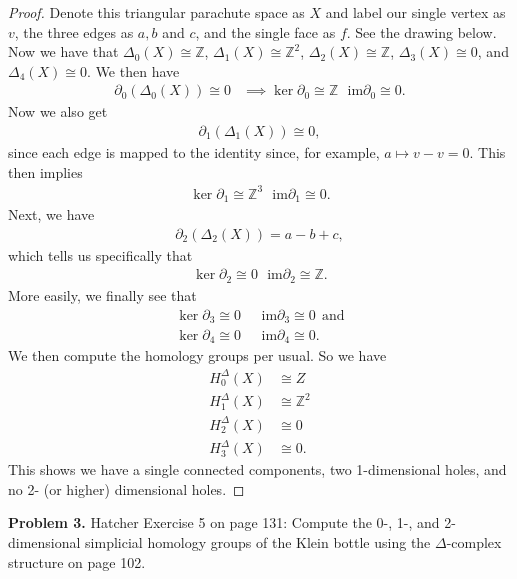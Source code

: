 \documentclass[leqno]{article}
\theoremstyle{nonumberplain}
\newtheorem{proof}{Proof}
\newcommand{\im}{\mathrm{im}}
\newcommand{\Z}{\mathbb{Z}}
\begin{document}
\begin{proof}
Denote this triangular parachute space as $X$ and label our single vertex as $v$, the three edges as $a,b$ and $c$, and the single face as $f$.  See the drawing below.
\vspace*{4cm}\\

Now we have that $\Delta_0(X) \cong \Z$, $\Delta_1(X) \cong \Z^2$, $\Delta_2(X) \cong \Z$, $\Delta_3(X)\cong 0$, and $\Delta_4(X) \cong 0$.  We then have
\begin{align*}
\partial_0 (\Delta_0(X)) \cong 0 &\implies \ker \partial_0 \cong \Z ~~~ \im \partial_0 \cong 0.
\end{align*}
Now we also get
\begin{align*}
\partial_1 (\Delta_1(X)) \cong 0,
\end{align*}
since each edge is mapped to the identity since, for example, $a\mapsto v-v = 0$. This then implies
\begin{align*}
\ker \partial_1 \cong \Z^3 ~~~ \im \partial_1 \cong 0.
\end{align*}
Next, we have
\begin{align*}
\partial_2 (\Delta_2(X))=a-b+c, 
\end{align*}
which tells us specifically that
\begin{align*}
\ker \partial_2 \cong 0 ~~~ \im \partial_2 \cong \Z.
\end{align*}
More easily, we finally see that
\begin{align*}
\ker \partial_3 \cong 0 ~&~~ \im \partial_3 \cong 0 ~~\textrm{and}\\
\ker \partial_4 \cong 0 ~&~~ \im \partial_4 \cong 0.
\end{align*}
We then compute the homology groups per usual.  So we have
\begin{align*}
H_0^\Delta (X) &\cong Z\\
H_1^\Delta(X) &\cong \Z^2\\
H_2^\Delta(X) &\cong 0\\
H_3^\Delta(X) &\cong 0.
\end{align*}
This shows we have a single connected components, two 1-dimensional holes, and no 2- (or higher) dimensional holes.
\end{proof}

\vspace*{1cm}


\noindent\textbf{Problem 3.} Hatcher Exercise 5 on page 131: Compute the 0-, 1-, and 2-dimensional simplicial homology groups of the Klein bottle using the $\Delta$-complex structure on page 102.
\end{document}
